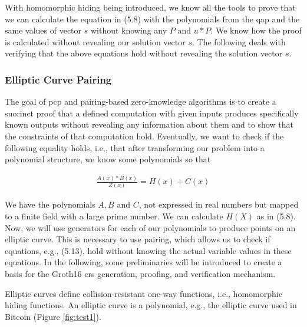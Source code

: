 With homomorphic hiding being introduced, we know all the tools to prove that we can calculate the equation in (5.8) with the polynomials from the \acrshort{qap} and the same values of vector \(s\) without knowing any \(P\) and \(u * P\). We know how the proof is calculated without revealing our solution vector \(s\). The following deals with verifying that the above equations hold without revealing the solution vector \(s\).

\subsubsection{Elliptic Curve Pairing}
The goal of \acrshort{pcp} and pairing-based zero-knowledge algorithms is to create a succinct proof that a defined computation with given inputs produces specifically known outputs without revealing any information about them and to show that the constraints of that computation hold. Eventually, we want to check if the following equality holds, i.e., that after transforming our problem into a polynomial structure, we know some polynomials so that

\begin{align}
    \frac{A(x) * B(x)}{Z(x)} = H(x) + C(x)
\end{align}

We have the polynomials \(A, B \text{ and }C\), not expressed in real numbers but mapped to a finite field with a large prime number. We can calculate \(H(X)\) as in (5.8). Now, we will use generators for each of our polynomials to produce points on an elliptic curve. This is necessary to use pairing, which allows us to check if equations, e.g., (5.13), hold without knowing the actual variable values in these equations. In the following, some preliminaries will be introduced to create a basis for the Groth16 \acrshort{crs} generation, proofing, and verification mechanism.

Elliptic curves define collision-resistant one-way functions, i.e., homomorphic hiding functions. An elliptic curve is a polynomial, e.g., the elliptic curve used in Bitcoin (Figure \ref{fig:test1}). 

